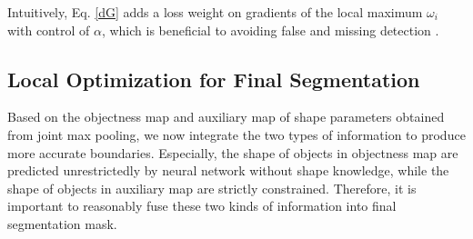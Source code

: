 Intuitively, Eq. \ref{dG} adds a loss weight on gradients of the local maximum $\omega_{i}$ with control of $\alpha$, which is beneficial to avoiding false and missing detection .

\subsection{Local Optimization for Final Segmentation}
\label{sec:fusion}
Based on the objectness map and auxiliary map of shape parameters obtained from joint max pooling, we now integrate the two types of information to produce more accurate boundaries.
Especially, the shape of objects in objectness map are predicted unrestrictedly by neural network without shape knowledge, while the shape of objects in auxiliary map are strictly constrained.
Therefore, it is important to reasonably fuse these two kinds of information into final segmentation mask.

